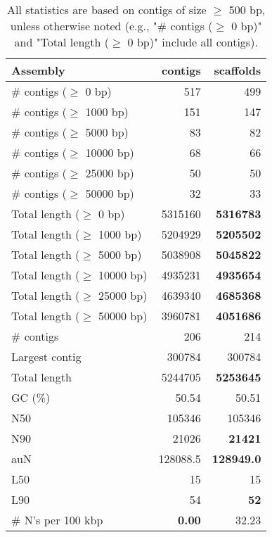 \documentclass[12pt,a4paper]{article}
\begin{document}
\begin{table}[ht]
\begin{center}
\caption{All statistics are based on contigs of size $\geq$ 500 bp, unless otherwise noted (e.g., "\# contigs ($\geq$ 0 bp)" and "Total length ($\geq$ 0 bp)" include all contigs).}
\begin{tabular}{|l*{2}{|r}|}
\hline
Assembly & contigs & scaffolds \\ \hline
\# contigs ($\geq$ 0 bp) & 517 & 499 \\ \hline
\# contigs ($\geq$ 1000 bp) & 151 & 147 \\ \hline
\# contigs ($\geq$ 5000 bp) & 83 & 82 \\ \hline
\# contigs ($\geq$ 10000 bp) & 68 & 66 \\ \hline
\# contigs ($\geq$ 25000 bp) & 50 & 50 \\ \hline
\# contigs ($\geq$ 50000 bp) & 32 & 33 \\ \hline
Total length ($\geq$ 0 bp) & 5315160 & {\bf 5316783} \\ \hline
Total length ($\geq$ 1000 bp) & 5204929 & {\bf 5205502} \\ \hline
Total length ($\geq$ 5000 bp) & 5038908 & {\bf 5045822} \\ \hline
Total length ($\geq$ 10000 bp) & 4935231 & {\bf 4935654} \\ \hline
Total length ($\geq$ 25000 bp) & 4639340 & {\bf 4685368} \\ \hline
Total length ($\geq$ 50000 bp) & 3960781 & {\bf 4051686} \\ \hline
\# contigs & 206 & 214 \\ \hline
Largest contig & 300784 & 300784 \\ \hline
Total length & 5244705 & {\bf 5253645} \\ \hline
GC (\%) & 50.54 & 50.51 \\ \hline
N50 & 105346 & 105346 \\ \hline
N90 & 21026 & {\bf 21421} \\ \hline
auN & 128088.5 & {\bf 128949.0} \\ \hline
L50 & 15 & 15 \\ \hline
L90 & 54 & {\bf 52} \\ \hline
\# N's per 100 kbp & {\bf 0.00} & 32.23 \\ \hline
\end{tabular}
\end{center}
\end{table}
\end{document}
